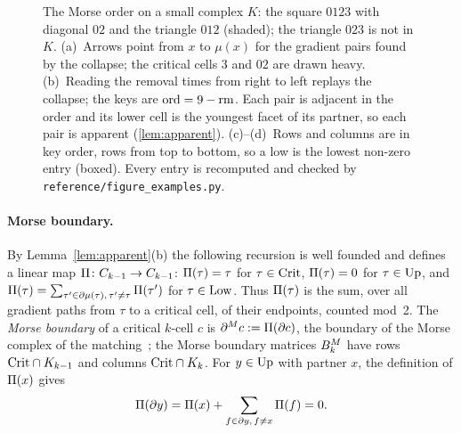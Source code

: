 \begin{figure}[t]
\centering

\caption{The Morse order on a small complex $K$: the square $0123$ with
diagonal $02$ and the triangle $012$ (shaded); the triangle $023$ is not in $K$.
(a)~Arrows point from $x$ to $\mu(x)$ for the gradient pairs found by the
collapse; the critical cells $3$ and $02$ are drawn heavy.
(b)~Reading the removal times from right to left replays the collapse; the keys
are $\operatorname{ord}=9-\operatorname{rm}$. Each pair is adjacent in the order and its lower cell is the
youngest facet of its partner, so each pair is apparent (\cref{lem:apparent}).
(c)--(d)~Rows and columns are in key order, rows from top to bottom, so a low is
the lowest non-zero entry (boxed).
Every entry is recomputed and checked by \texttt{reference/figure\_examples.py}.}
\label{fig:morse}
\end{figure}

\paragraph{Morse boundary.} By Lemma~\ref{lem:apparent}(b) the following
recursion is well founded and defines a linear map
$\Pi\colon C_{k-1}\to C_{k-1}$: $\Pi(\tau)=\tau$ for $\tau\in\mathrm{Crit}$,
$\Pi(\tau)=0$ for $\tau\in\mathrm{Up}$, and
$\Pi(\tau)=\sum_{\tau'\in\partial\mu(\tau),\,\tau'\ne\tau}\Pi(\tau')$ for
$\tau\in\mathrm{Low}$. Thus $\Pi(\tau)$ is the sum, over all gradient paths from $\tau$
to a critical cell, of their endpoints, counted mod~2. The \emph{Morse boundary}
of a critical $k$-cell $c$ is $\partial^{M} c:=\Pi(\partial c)$, the boundary of the Morse
complex of the matching~\cite{forman2002user}; the Morse boundary matrices
$B_{k}^M$ have rows $\mathrm{Crit}\cap K_{k-1}$ and columns $\mathrm{Crit}\cap K_{k}$. For
$y\in\mathrm{Up}$ with partner $x$, the definition of $\Pi(x)$ gives
\begin{equation}\label{eq:flow-kills}
  \Pi(\partial y)=\Pi(x)+\sum_{f\in\partial y,\,f\ne x}\Pi(f)=0 .
\end{equation}

